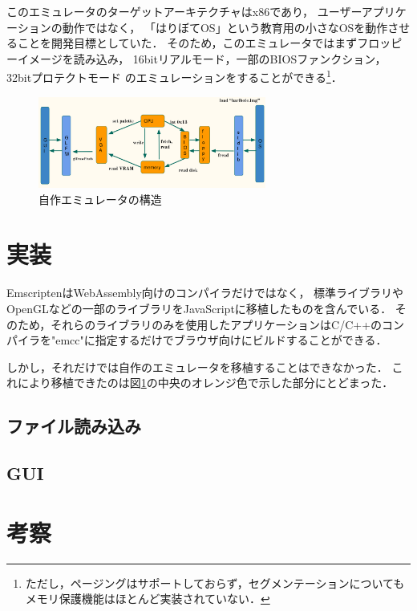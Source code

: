 \documentclass[a4j,10pt]{jsarticle}
\begin{document}
このエミュレータのターゲットアーキテクチャはx86であり，
ユーザーアプリケーションの動作ではなく，
「はりぼてOS」という教育用の小さなOSを動作させることを開発目標としていた．
そのため，このエミュレータではまずフロッピーイメージを読み込み，
16bitリアルモード，一部のBIOSファンクション，32bitプロテクトモード
のエミュレーションをすることができる\footnote{ただし，ページングはサポートしておらず，セグメンテーションについてもメモリ保護機能はほとんど実装されていない．}．

\begin{figure}[htbp]
	\begin{center}
		\includegraphics[width=7.5cm]{./emu_struct.png}
		\caption{自作エミュレータの構造}
		\label{emustruct}
	\end{center}
\end{figure}

\section{実装}
EmscriptenはWebAssembly向けのコンパイラだけではなく，
標準ライブラリやOpenGLなどの一部のライブラリをJavaScriptに移植したものを含んでいる．
そのため，それらのライブラリのみを使用したアプリケーションはC/C++のコンパイラを"emcc"に指定するだけでブラウザ向けにビルドすることができる．

しかし，それだけでは自作のエミュレータを移植することはできなかった．
これにより移植できたのは図\ref{emustruct}の中央のオレンジ色で示した部分にとどまった．

\subsection{ファイル読み込み}
\subsection{GUI}

\section{考察}



\end{document}
